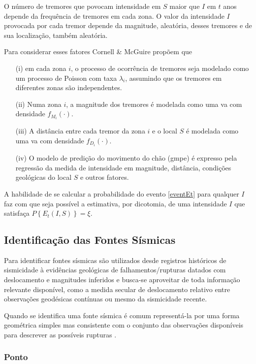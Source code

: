 O número de tremores que povocam intensidade em $S$ maior que $I$ em $t$ anos depende da frequência
de tremores em cada zona. O valor da intensidade $I$ provocada por cada tremor depende da magnitude,
aleatória, desses tremores e de sua localização, também aleatória.

Para considerar esses fatores Cornell \& McGuire propõem que
\begin{itemize}
\item[(i)] em cada zona $i$, o processo de ocorrência de tremores seja 
modelado como um processo de Poisson com taxa $\lambda_i$, assumindo que os tremores em diferentes zonas são
independentes.
\item[(ii)] Numa zona $i$, a magnitude dos tremores é modelada como uma \gls{va}
com densidade $f_{M_i}(\cdot)$.
\item[(iii)] A distância entre cada tremor da zona $i$ e o local $S$ é modelada como uma \gls{va}
com densidade $f_{D_i}(\cdot)$.
\item[(iv)] O modelo de predição do movimento do chão (\gls{gmpe}) é expresso pela regressão da medida de intensidade
em magnitude, distância, condições geológicas do local $S$ e outros fatores.
\end{itemize}


A habilidade de se calcular a probabilidade do evento
\eqref{eventEt} para qualquer $I$ faz com que seja possível a estimativa, por dicotomia, de uma intensidade $I$ que satisfaça
$P\left\{ E_t(I, S) \right\} = \xi$.


\subsection{Identificação das Fontes Sísmicas}
Para identificar fontes sísmicas são utilizados desde registros históricos de sismicidade à evidências geológicas de
falhamentos/rupturas datados com deslocamento e magnitudes inferidos e busca-se aproveitar de toda informação relevante
disponível, como a medida secular de deslocamento relativo entre observações geodésicas contínuas ou mesmo da
sismicidade recente.

Quando se identifica uma fonte sísmica é comum representá-la por uma forma geométrica simples mas consistente com o
conjunto das observações disponíveis para descrever as possíveis rupturas \citep{crowley_2013}. 

\subsubsection{Ponto}
\label{sec:point_source}

